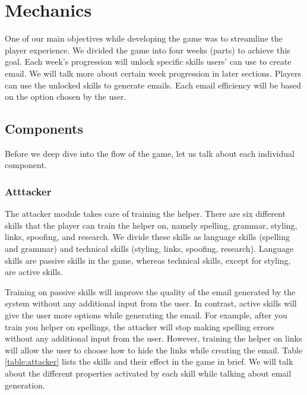 \section{Mechanics}
One of our main objectives while developing the game was to streamline the player experience. We divided the game into four weeks (parts) to achieve this goal. Each week's progression will unlock specific skills users' can use to create email. We will talk more about certain week progression in later sections. Players can use the unlocked skills to generate emails. Each email efficiency will be based on the option chosen by the user.

\subsection{Components}
Before we deep dive into the flow of the game, let us talk about each individual component.

\subsubsection{Atttacker}
The attacker module takes care of training the helper. There are six different skills that the player can train the helper on, namely spelling, grammar, styling, links, spoofing, and research. We divide these skills as language skills (spelling and grammar) and technical skills (styling, links, spoofing, research). Language skills are passive skills in the game, whereas technical skills, except for styling, are active skills.

Training on passive skills will improve the quality of the email generated by the system without any additional input from the user. In contrast, active skills will give the user more options while generating the email. For example, after you train you helper on spellings, the attacker will stop making spelling errors without any additional input from the user. However, training the helper on links will allow the user to choose how to hide the links while creating the email. Table \ref{table:attacker} lists the skills and their effect in the game in brief. We will talk about the different properties activated by each skill while talking about email generation.

